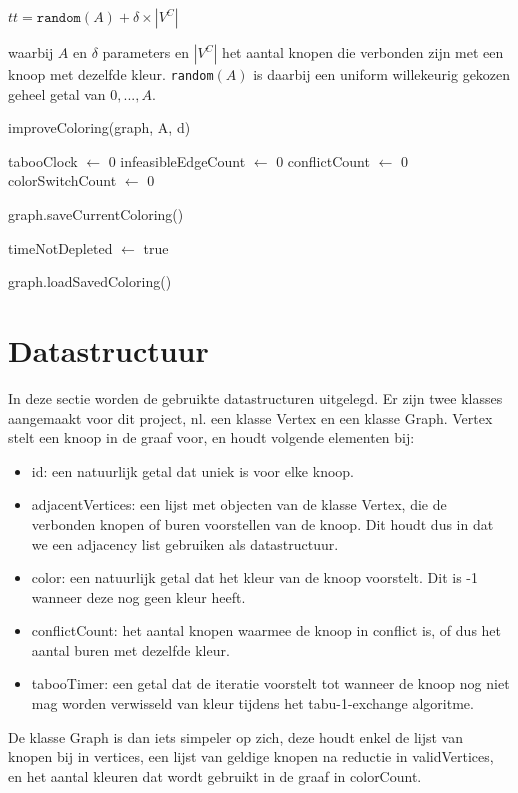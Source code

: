 \documentclass[a4paper,kulak]{kulakarticle} %
\begin{document}
\begin{math}
	tt = \texttt{random}(A) + \delta \times |V^C|
\end{math}

waarbij $A$ en $\delta$ parameters en $|V^C|$ het aantal knopen die verbonden zijn met een knoop met dezelfde kleur. \texttt{random}$(A)$ is daarbij een uniform willekeurig gekozen geheel getal van ${0,...,A}$.

\begin{function}
	\caption{improveColoring(graph, A, d)}\label{func:color_improvement}
	
	tabooClock $\gets$ 0
	infeasibleEdgeCount $\gets$ 0\;
	conflictCount $\gets$ 0\;
	colorSwitchCount $\gets$ 0\;
	
	graph.saveCurrentColoring()\;
	
	timeNotDepleted $\gets$ true\;
	
	graph.loadSavedColoring()\;
	
\end{function}

\section{Datastructuur}

In deze sectie worden de gebruikte datastructuren uitgelegd. Er zijn twee klasses aangemaakt voor dit project, nl. een klasse Vertex en een klasse Graph. Vertex stelt een knoop in de graaf voor, en houdt volgende elementen bij:
\begin{itemize}
	\item id: een natuurlijk getal dat uniek is voor elke knoop.
	\item adjacentVertices: een lijst met objecten van de klasse Vertex, die de verbonden knopen of buren voorstellen van de knoop. Dit houdt dus in dat we een adjacency list gebruiken als datastructuur.
	\item color: een natuurlijk getal dat het kleur van de knoop voorstelt. Dit is -1 wanneer deze nog geen kleur heeft.
	\item conflictCount: het aantal knopen waarmee de knoop in conflict is, of dus het aantal buren met dezelfde kleur.
	\item tabooTimer: een getal dat de iteratie voorstelt tot wanneer de knoop nog niet mag worden verwisseld van kleur tijdens het tabu-1-exchange algoritme.
\end{itemize}
De klasse Graph is dan iets simpeler op zich, deze houdt enkel de lijst van knopen bij in vertices, een lijst van geldige knopen na reductie in validVertices, en het aantal kleuren dat wordt gebruikt in de graaf in colorCount.
\end{document}
